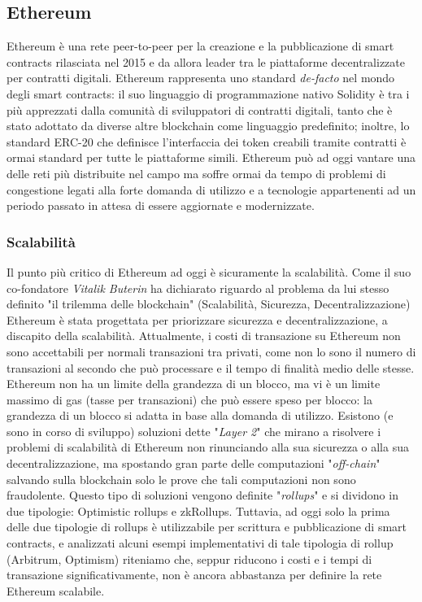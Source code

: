 \documentclass[a4paper, 12pt]{article}
\begin{document}
\subsection*{Ethereum}
Ethereum è una rete peer-to-peer per la creazione e la pubblicazione di smart contracts rilasciata nel 2015 e da allora leader tra le piattaforme decentralizzate
per contratti digitali.
Ethereum rappresenta uno standard \textit{de-facto} nel mondo degli smart contracts: il suo linguaggio di programmazione nativo Solidity è
tra i più apprezzati dalla comunità di sviluppatori di contratti digitali, tanto che è stato adottato da diverse altre blockchain come linguaggio predefinito; inoltre, lo standard ERC-20 che definisce l'interfaccia dei token creabili tramite contratti è ormai standard per tutte le piattaforme simili.
Ethereum può ad oggi vantare una delle reti più distribuite nel campo ma soffre ormai da tempo di problemi di congestione legati alla forte domanda di utilizzo e a tecnologie appartenenti ad un periodo passato in attesa di essere aggiornate e modernizzate.

\subsubsection*{Scalabilità}
Il punto più critico di Ethereum ad oggi è sicuramente la scalabilità.
Come il suo co-fondatore \textit{Vitalik Buterin} ha dichiarato riguardo al problema da lui stesso definito "il trilemma delle blockchain" (Scalabilità, Sicurezza, Decentralizzazione)
Ethereum è stata progettata per priorizzare sicurezza e decentralizzazione, a discapito della scalabilità.
Attualmente, i costi di transazione su Ethereum non sono accettabili per normali transazioni tra privati, come non lo sono il numero di transazioni al secondo che può
processare e il tempo di finalità medio delle stesse.
Ethereum non ha un limite della grandezza di un blocco, ma vi è un limite massimo di gas (tasse per transazioni) che può essere speso per blocco: la grandezza di un blocco si adatta
in base alla domanda di utilizzo.
Esistono (e sono in corso di sviluppo) soluzioni dette "\textit{Layer 2}" che mirano a risolvere i problemi di scalabilità di Ethereum non rinunciando alla sua sicurezza
o alla sua decentralizzazione, ma spostando gran parte delle computazioni "\textit{off-chain}" salvando sulla blockchain solo le prove che tali computazioni non sono
fraudolente. Questo tipo di soluzioni vengono definite "\textit{rollups}" e si dividono in due tipologie: Optimistic rollups e zkRollups.
Tuttavia, ad oggi solo la prima delle due tipologie di rollups è utilizzabile per scrittura e pubblicazione di smart contracts, e analizzati alcuni esempi
implementativi di tale tipologia di rollup (Arbitrum, Optimism) riteniamo che, seppur riducono i costi e i tempi di transazione significativamente,
non è ancora abbastanza per definire la rete Ethereum scalabile.
\end{document}

